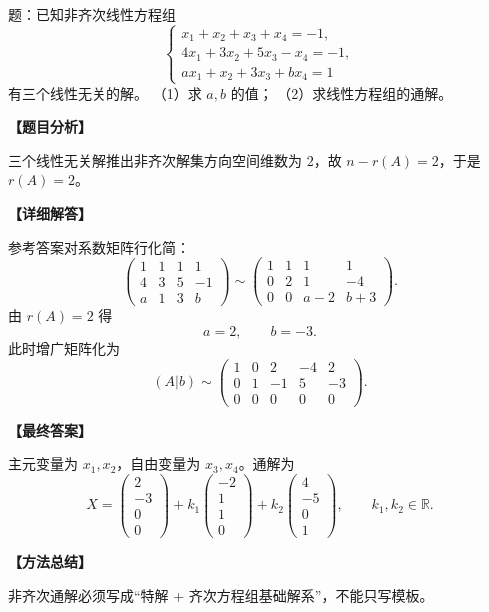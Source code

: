 ﻿\documentclass[11pt,a4paper,UTF8]{ctexart}
\begin{document}
\begin{answerbox}
题：已知非齐次线性方程组
\[
\begin{cases}
x_1+x_2+x_3+x_4=-1,\\
4x_1+3x_2+5x_3-x_4=-1,\\
ax_1+x_2+3x_3+bx_4=1
\end{cases}
\]
有三个线性无关的解。
（1）求 $a,b$ 的值；
（2）求线性方程组的通解。

\textbf{【题目分析】}

三个线性无关解推出非齐次解集方向空间维数为 \(2\)，故 \(n-r(A)=2\)，于是 \(r(A)=2\)。

\textbf{【详细解答】}

参考答案对系数矩阵行化简：
\[
\begin{pmatrix}
1&1&1&1\\
4&3&5&-1\\
a&1&3&b
\end{pmatrix}
\sim
\begin{pmatrix}
1&1&1&1\\
0&2&1&-4\\
0&0&a-2&b+3
\end{pmatrix}.
\]
由 \(r(A)=2\) 得
\[
a=2,\qquad b=-3.
\]
此时增广矩阵化为
\[
(A|b)\sim
\begin{pmatrix}
1&0&2&-4&2\\
0&1&-1&5&-3\\
0&0&0&0&0
\end{pmatrix}.
\]

\textbf{【最终答案】}

主元变量为 \(x_1,x_2\)，自由变量为 \(x_3,x_4\)。通解为
\[
X=
\begin{pmatrix}2\\-3\\0\\0\end{pmatrix}
+k_1\begin{pmatrix}-2\\1\\1\\0\end{pmatrix}
+k_2\begin{pmatrix}4\\-5\\0\\1\end{pmatrix},
\qquad k_1,k_2\in\mathbb R.
\]

\textbf{【方法总结】}

非齐次通解必须写成“特解 + 齐次方程组基础解系”，不能只写模板。
\end{answerbox}
\end{document}
